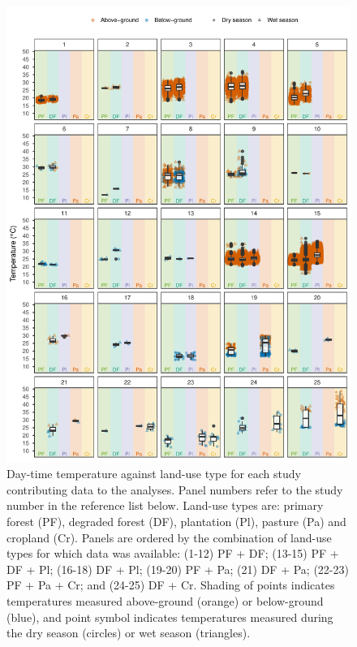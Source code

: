 \documentclass[12pt,a4paper,]{report}
\theoremstyle{definition}
\theoremstyle{definition}
\theoremstyle{definition}
\theoremstyle{remark}
\begin{document}
\begin{figure}[H]

{\centering \includegraphics{./output/fig-A-1-1} 

}

\caption{Day-time temperature against land-use type for each study
contributing data to the analyses. Panel numbers refer to the study
number in the reference list below. Land-use types are: primary forest
(PF), degraded forest (DF), plantation (Pl), pasture (Pa) and cropland
(Cr). Panels are ordered by the combination of land-use types for which
data was available: (1-12) PF + DF; (13-15) PF + DF + Pl; (16-18) DF +
Pl; (19-20) PF + Pa; (21) DF + Pa; (22-23) PF + Pa + Cr; and (24-25) DF
+ Cr. Shading of points indicates temperatures measured above-ground
(orange) or below-ground (blue), and point symbol indicates temperatures
measured during the dry season (circles) or wet season (triangles).}\label{fig:fig-A-1}
\end{figure}
\end{document}
